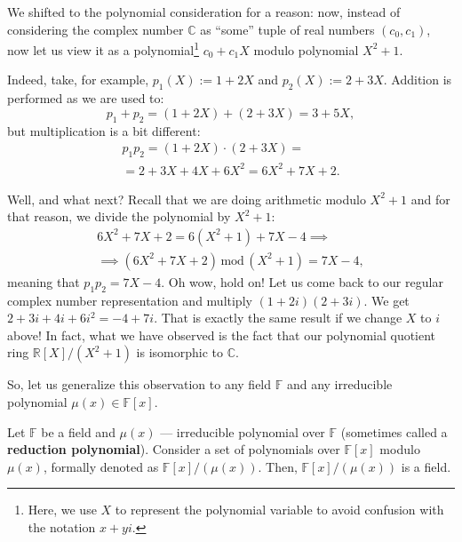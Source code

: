 \documentclass[../lecture-notes.tex]{subfiles}
\begin{document}
We shifted to the polynomial consideration for a reason: now, instead of considering the complex number $\mathbb{C}$ as ``some'' tuple of real numbers $(c_0,c_1)$, now let us view it as a polynomial\footnote{Here, we use $X$ to represent the polynomial variable to avoid confusion with the notation $x+yi$.} $c_0+c_1X$ modulo polynomial $X^2+1$. 

\begin{example}
Indeed, take, for example, $p_1(X) := 1+2X$ and $p_2(X) := 2+3X$. Addition is performed as we are used to:
\begin{equation*}
    p_1 + p_2 = (1+2X) + (2+3X) = 3+5X,
\end{equation*}
but multiplication is a bit different:
\begin{equation*}
    \begin{aligned}
        p_1p_2 = (1+2X) \cdot (2+3X) = \\
        = 2+3X+4X+6X^2 = 6X^2+7X+2.        
    \end{aligned}
\end{equation*}

Well, and what next? Recall that we are doing arithmetic modulo $X^2+1$ and for that reason, we divide the polynomial by $X^2+1$:
\begin{equation*}
    \begin{aligned}    
        6X^2+7X+2 = 6(X^2+1) + 7X - 4 \implies \\
        \implies (6X^2+7X+2) \,\text{mod}\, (X^2+1) = 7X-4,
    \end{aligned}
\end{equation*}
meaning that $p_1p_2 = 7X-4$. Oh wow, hold on! Let us come back to our regular complex number representation and multiply $(1+2i)(2+3i)$. We get $2+3i+4i+6i^2=-4+7i$. That is exactly the same result if we change $X$ to $i$ above! In fact, what we have observed is the fact that our polynomial quotient ring $\mathbb{R}[X]/(X^2+1)$ is isomorphic to $\mathbb{C}$.
\end{example}

So, let us generalize this observation to any field $\mathbb{F}$ and any irreducible polynomial $\mu(x) \in \mathbb{F}[x]$.

\begin{theorem}
    Let $\mathbb{F}$ be a field and $\mu(x)$ --- irreducible polynomial over $\mathbb{F}$ (sometimes called a \textbf{reduction polynomial}). Consider a set of polynomials over $\mathbb{F}[x]$ modulo $\mu(x)$, formally denoted as $\mathbb{F}[x]/(\mu(x))$. Then, $\mathbb{F}[x]/(\mu(x))$ is a field.
\end{theorem}
\end{document}
